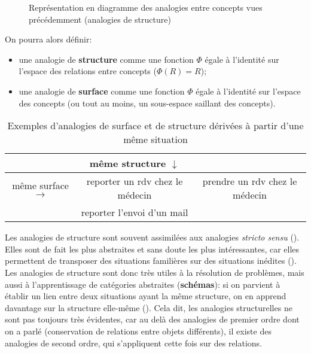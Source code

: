 \documentclass[french]{article}
\begin{document}
			\begin{figure}[H]
				\centering
			\caption{Représentation en diagramme des analogies entre concepts vues précédemment (analogies de structure)}
			\end{figure}
			On pourra alors définir:
			\begin{itemize}
				\item une analogie de \textbf{structure} comme une fonction $\Phi$ égale à l'identité sur l'espace des relations entre concepts ($\Phi(R) = R$);
				\item une analogie de \textbf{surface} comme une fonction $\Phi$ égale à l'identité sur l'espace des concepts (ou tout au moins, un sous-espace saillant des concepts).
			\end{itemize}
		\begin{table}[H]
			\begin{tabular}{c|c|c}
				& même structure $\downarrow$ & \\ \hline
				même surface $\rightarrow$ & reporter un rdv chez le médecin & prendre un rdv chez le médecin\\ \hline
				& reporter l'envoi d'un mail & 
			\end{tabular}
			\caption{Exemples d'analogies de surface et de structure dérivées à partir d'une même situation}
		\end{table}
			Les analogies de structure sont souvent assimilées aux analogies \textit{stricto sensu} (\cite{holyoak2012}). Elles sont de fait les plus abstraites et sans doute les plus intéressantes, car elles permettent de transposer des situations familières sur des situations inédites (\cite{gentner1997}). Les analogies de structure sont donc très utiles à la résolution de problèmes, mais aussi à l'apprentissage de catégories abstraites (\textbf{schémas}): si on parvient à établir un lien entre deux situations ayant la même structure, on en apprend davantage sur la structure elle-même (\cite{gentner1997,holyoak2012}). Cela dit, les analogies structurelles ne sont pas toujours très évidentes, car au delà des analogies de premier ordre dont on a parlé (conservation de relations entre objets différents), il existe des analogies de second ordre, qui s'appliquent cette fois sur des relations. 
\end{document}
